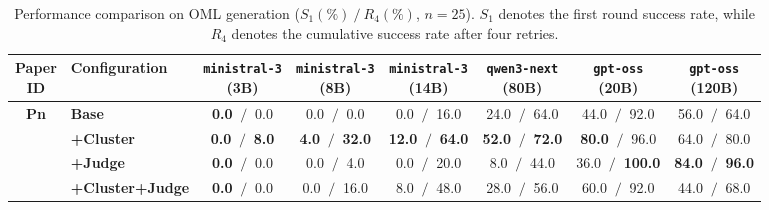 \begin{table}[htbp]
    \centering
    \small
    \setlength{\tabcolsep}{4pt}
    \caption{Performance comparison on OML generation ($S_1(\%)~/~R_4(\%)$, $n=25$). $S_1$ denotes the first round success rate, while $R_4$ denotes the cumulative success rate after four retries.}
    \begin{tabular}{c|l|cccccc}
        \hline
        \makecell{\textbf{Paper} \\ \textbf{ID}} & \textbf{Configuration} & \makecell{\texttt{ministral-3} \\ (3B)} & \makecell{\texttt{ministral-3} \\ (8B)} & \makecell{\texttt{ministral-3} \\ (14B)} & \makecell{\texttt{qwen3-next} \\ (80B)} & \makecell{\texttt{gpt-oss} \\ (20B)} & \makecell{\texttt{gpt-oss} \\ (120B)} \\
        \hline
        
        \multirow{4}{*}{\textbf{Pn}} 
          & \textbf{Base}& \textbf{0.0} $~/~$ 0.0 & 0.0 $~/~$ 0.0 & 0.0 $~/~$ 16.0 & 24.0 $~/~$ 64.0 & 44.0 $~/~$ 92.0 & 56.0 $~/~$ 64.0 \\
          & \textbf{+Cluster}& \textbf{0.0} $~/~$ \textbf{8.0} & \textbf{4.0} $~/~$ \textbf{32.0} & \textbf{12.0} $~/~$ \textbf{64.0} & \textbf{52.0} $~/~$ \textbf{72.0} & \textbf{80.0} $~/~$ 96.0 & 64.0 $~/~$ 80.0 \\
          & \textbf{+Judge}& \textbf{0.0} $~/~$ 0.0 & 0.0 $~/~$ 4.0 & 0.0 $~/~$ 20.0 & 8.0 $~/~$ 44.0 & 36.0 $~/~$ \textbf{100.0} & \textbf{84.0} $~/~$ \textbf{96.0} \\
          & \textbf{+Cluster+Judge}& \textbf{0.0} $~/~$ 0.0 & 0.0 $~/~$ 16.0 & 8.0 $~/~$ 48.0 & 28.0 $~/~$ 56.0 & 60.0 $~/~$ 92.0 & 44.0 $~/~$ 68.0 \\
        \hline
        
    \end{tabular}
    \label{tab:success_rates_pn}
\end{table}